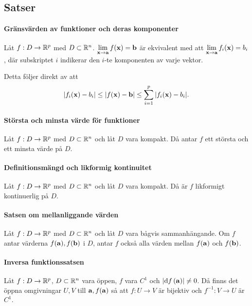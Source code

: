 \subsection{Satser}

\paragraph{Gränsvärden av funktioner och deras komponenter}
Låt $f: D\to\mathbb{R}^p$ med $D\subset\mathbb{R}^n$. $\limit{\vect{x}}{\vect{a}}f(\vect{x}) = \vect{b}$ är ekvivalent med att $\limit{\vect{x}}{\vect{a}}f_i(\vect{x}) = b_i$, där subskriptet $i$ indikerar den $i$-te komponenten av varje vektor.

\proof
Detta följer direkt av att
\begin{align*}
	\abs{f_i(\vect{x}) - b_i}\leq\abs{f(\vect{x}) - \vect{b}}\leq\sum\limits_{i = 1}^{p}\abs{f_i(\vect{x}) - b_i}.
\end{align*}

\paragraph{Största och minsta värde för funktioner}
Låt $f: D\to\mathbb{R}^p$ med $D\subset\mathbb{R}^n$ och låt $D$ vara kompakt. Då antar $f$ ett största och ett minsta värde på $D$.

\proof

\paragraph{Definitionsmängd och likformig kontinuitet}
Låt $f: D\to\mathbb{R}^p$ med $D\subset\mathbb{R}^n$ och låt $D$ vara kompakt. Då är $f$ likformigt kontinuerlig på $D$.

\proof

\paragraph{Satsen om mellanliggande värden}
Låt $f: D\to\mathbb{R}^p$ med $D\subset\mathbb{R}^n$ och låt $D$ vara bågvis sammanhängande. Om $f$ antar värderna $f(\vect{a}), f(\vect{b})$ i $D$, antar $f$ också alla värden mellan $f(\vect{a})$ och $f(\vect{b})$.

\proof

\paragraph{Inversa funktionssatsen}
Låt $f: D\to\mathbb{R}^p$, $D\subset\mathbb{R}^n$ vara öppen, $f$ vara $C^1$ och $\abs{\dd{f} (\vect{a})}\neq 0$. Då finns det öppna omgivningar $U, V$ till $\vect{a}, f(\vect{a})$ så att $f:U\to V$ är bijektiv och $f^{-1}: V\to U$ är $C^1$.

